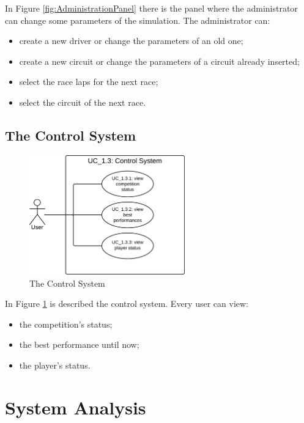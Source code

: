 In Figure \ref{fig:AdministrationPanel} there is the panel where the administrator can change some parameters of the simulation. The administrator can:
\begin{itemize}
\item create a new driver or change the parameters of an old one;
\item create a new circuit or change the parameters of a circuit already inserted;
\item select the race laps for the next race;
\item select the circuit of the next race.
\end{itemize}

\subsection{The Control System}

\begin{figure}[H]
\centering %
\includegraphics[width=0.6\textwidth]{./img/UML/ControlSystem.png}
\caption{The Control System}
\label{fig:ControlSystem}
\end{figure}

In Figure \ref{fig:ControlSystem} is described the control system. Every user can view:
\begin{itemize}
\item the competition's status;
\item the best performance until now;
\item the player's status.
\end{itemize}

\section{System Analysis}

